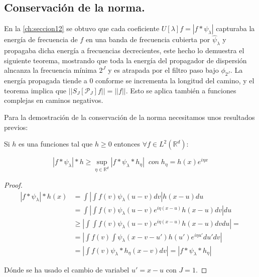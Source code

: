 \subsection{Conservación de la norma.}

En la \autoref{ch:seccion12} se obtuvo que cada coeficiente $U[\lambda]f=|f \ast \psi_\lambda|$ capturaba la energía de frecuencia de $f$ en una banda de frecuencia cubierta por $\widehat{\psi}_\lambda$ y propagaba dicha energía a frecuencias decrecientes, este hecho lo demuestra el siguiente teorema, mostrando que toda la energía del propagador de dispersión alncanza la frecuencia mínima $2^J$ y es atrapada por el filtro paso bajo $\phi_ {2^J}$. La energía propagada tiende a $0$ conforme se incrementa la longitud del camino, y el teorema implica que $||S_J[\mathcal{P}_J]f||=||f||$. Esto se aplica también a funciones complejas en caminos negativos.

\medskip

\noindent Para la demostración de la conservación de la norma necesitamos unos resultados previos: 

\begin{lema} \label{lema::Cota_inferior}
  Si $h$ es una funciones tal que $h\geq 0$ entonces $\forall f \in L^2(\mathbb{R}^d)$: 
  
  \begin{equation}
    |f \ast \psi_\lambda | \ast h \geq \sup_{\eta \in \mathbb{R}^d} |f\ast \psi_\lambda \ast h_\eta | \; \; con \; h_\eta=h(x)e^{i\eta x}
  \end{equation}
\end{lema}
  
\begin{proof}
  
  \begin{align*}
      |f \ast \psi_\lambda | \ast h (x) &= \int \left| \int f(v)\psi_\lambda(u-v)dv \right| h(x-u)du \\
      &=\int \left | \int f(v) \psi_\lambda(u-v) e^{i\eta(x-u)} h(x-u) dv \right| du \\
      &\geq \left | \int \int f(v) \psi_\lambda(u-v) e^{i\eta(x-u)} h(x-u) dv du \right| = \\
      &= \left | \int f(v) \int  \psi_\lambda(x-v-u')h(u') e^{i\eta u'}  du' dv \right| \\
      &= \left | \int f(v) \psi_\lambda \ast h_\eta(x-v) dv \right| = |f\ast \psi_\lambda \ast h_\eta|
  \end{align*}

  \noindent Dónde se ha usado el cambio de variabel $u'=x-u$ con $J=1$.
\end{proof}

